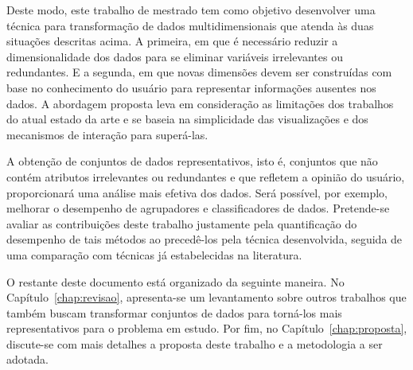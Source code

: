 Deste modo, este trabalho de mestrado tem como objetivo
desenvolver uma técnica para transformação de dados
multidimensionais que atenda às duas situações descritas
acima.  A primeira, em que é necessário reduzir a
dimensionalidade dos dados para se eliminar variáveis
irrelevantes ou redundantes. E a segunda, em que novas
dimensões devem ser construídas com base no conhecimento do
usuário para representar informações ausentes nos dados. A
abordagem proposta leva em consideração as limitações dos
trabalhos do atual estado da arte e se baseia na
simplicidade das visualizações e dos mecanismos de interação
para superá-las. 

A obtenção de conjuntos de dados representativos, isto é,
conjuntos que não contém atributos irrelevantes ou
redundantes e que refletem a opinião do usuário,
proporcionará uma análise mais efetiva dos dados. Será
possível, por exemplo, melhorar o desempenho de agrupadores
e classificadores de dados. Pretende-se avaliar as
contribuições deste trabalho justamente pela quantificação
do desempenho de tais métodos ao precedê-los pela técnica
desenvolvida, seguida de uma comparação com técnicas já
estabelecidas na literatura.

O restante deste documento está organizado da seguinte
maneira. No Capítulo~\ref{chap:revisao}, apresenta-se um
levantamento sobre outros trabalhos que também buscam
transformar conjuntos de dados para torná-los mais
representativos para o problema em estudo. Por fim, no
Capítulo~\ref{chap:proposta}, discute-se com mais detalhes a
proposta deste trabalho e a metodologia a ser adotada. 

